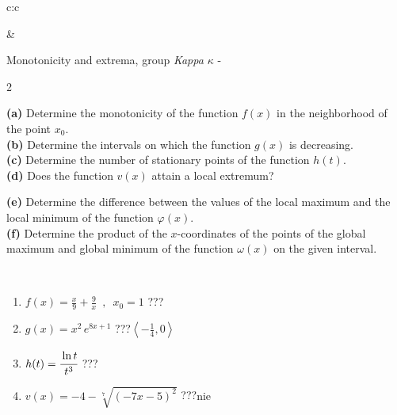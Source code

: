 \documentclass[10pt]{report}
\begin{document}
\begin{tabular}{c:c}
\begin{minipage}[c][104.5mm][t]{0.5\linewidth}
\begin{center}
\end{center}
\end{minipage}
&
\begin{minipage}[c][104.5mm][t]{0.5\linewidth}
\begin{center}
\vspace{5mm}
{\huge Monotonicity and extrema, group \textit{Kappa $\kappa$} -}\\[5mm]
\begin{minipage}{0.95\linewidth}
\begin{center}
{\small \begin{multicols}{2} \raggedright
\textbf{(a)} Determine the monotonicity of the function \(f(x)\) in the neighborhood of the point \(x_0\). \\[1mm]
\textbf{(b)} Determine the intervals on which the function \(g(x)\) is decreasing. \\[1mm]
\textbf{(c)} Determine the number of stationary points of the function \(h(t)\). \\[1mm]
\textbf{(d)} Does the function \(v(x)\) attain a local extremum? \par \columnbreak
\textbf{(e)} Determine the difference between the values of the local maximum and the local minimum of the function \(\varphi(x)\). \\[1mm]
\textbf{(f)} Determine the product of the \(x\)-coordinates of the points of the global maximum and global minimum of the function \(\omega(x)\) on the given interval. \\[1mm]
\end{multicols}
}
\end{center}
\end{minipage}
\\[1mm]
\begin{minipage}{0.79\linewidth}
\begin{center}
\begin{varwidth}{\linewidth}
\setlength{\itemsep}{0pt}
\begin{enumerate}
\normalsize
\item $f(x)=\frac{x}{9}+\frac{9}{x} \enspace , \enspace x_0=1$\quad \dotfill\; ???\;\dotfill \quad {}
\item $g(x)=x^2\, e^{8x+1}$\quad \dotfill\; ???\;\dotfill \quad $\left\langle-\frac{1}{4} , 0\right\rangle$
\item $h(t)=\cfrac{\ln t}{t^3}$\quad \dotfill\; ???\;\dotfill {}
\item $v(x)=-4-\sqrt[7]{(-7x-5)^2}$\quad \dotfill\; ???\;\dotfill \quad $\text{nie}$

\end{enumerate}
\end{varwidth}
\end{center}
\end{minipage}
\end{center}
\end{minipage}
\end{tabular}
\end{document}
